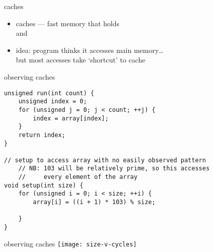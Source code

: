 \begin{frame}{caches}
    \begin{itemize}
    \item caches --- fast memory that holds\\
         and \\
    \item idea: program thinks it accesses main memory\ldots \\
        but most accesses take `shortcut' to cache
    \end{itemize} 
\end{frame}

\begin{frame}[fragile,label=observeCaches]{observing caches}
\lstset{
    language=C++,style=smaller
}
\begin{lstlisting}
unsigned run(int count) {
    unsigned index = 0;
    for (unsigned j = 0; j < count; ++j) {
        index = array[index];
    }
    return index;
}

// setup to access array with no easily observed pattern
    // NB: 103 will be relatively prime, so this accesses
    //     every element of the array
void setup(int size) {
    for (unsigned i = 0; i < size; ++i) {
        array[i] = ((i + 1) * 103) % size;

    }
}
\end{lstlisting}
\end{frame}

\begin{frame}{observing caches}
    \texttt{[image: size-v-cycles]}
\end{frame} 
